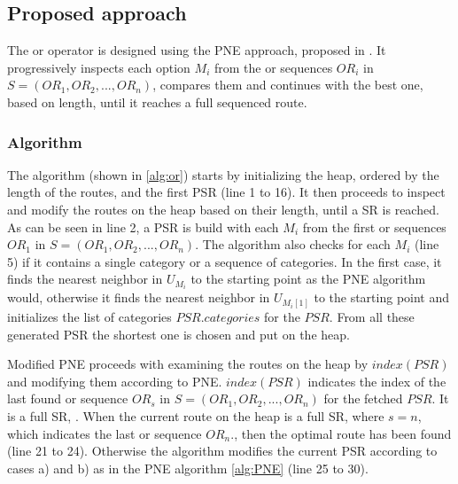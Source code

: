 \subsection{Proposed approach} 
\label{sec:approachOr}
The or operator is designed using the PNE approach, proposed in \cite{OSR}. It progressively inspects each option $M_i$ from the or sequences $OR_i$ in $S = (OR_1, OR_2, ..., OR_n)$, compares them and continues with the best one, based on length, until it reaches a full sequenced route.

\subsubsection{Algorithm}
\label{sec:algortihmOr}
The algorithm (shown in \ref{alg:or}) starts by initializing the heap, ordered by the length of the routes, and the first PSR (line 1 to 16). It then proceeds to inspect and modify the routes on the heap based on their length, until a SR is reached. As can be seen in line 2, a PSR is build with each $M_i$ from the first or sequences $OR_1$ in $S = (OR_1, OR_2, ..., OR_n)$. The algorithm also checks for each $M_i$ (line 5) if it contains a single category or a sequence of categories. In the first case, it finds the nearest neighbor in $U_{M_i}$ to the starting point as the PNE algorithm would, otherwise it finds the nearest neighbor in $U_{M_i[1]}$ to the starting point and initializes the list of categories $PSR.categories$ for the $PSR$. From all these generated PSR the shortest one is chosen and put on the heap.

Modified PNE proceeds with examining the routes on the heap by $index(PSR)$ and modifying them according to PNE. $index(PSR)$ indicates the index of the last found or sequence $OR_s$ in $S = (OR_1, OR_2, ..., OR_n)$ for the fetched $PSR$. It is a full SR, . When the current route on the heap is a full SR, where $s = n$, which indicates the last or sequence $OR_n.$, then the optimal route has been found (line 21 to 24). Otherwise the algorithm modifies the current PSR according to cases a) and b) as in the PNE algorithm \ref{alg:PNE} (line 25 to 30). \newline

